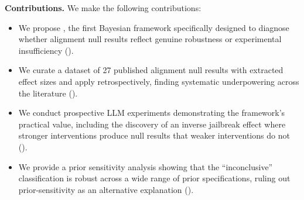{\bf Contributions.} We make the following contributions:
\begin{itemize}[leftmargin=*,itemsep=0pt,topsep=4pt]
    \item We propose \ours, the first Bayesian framework specifically designed to
    diagnose whether alignment null results reflect genuine robustness or
    experimental insufficiency ().
    \item We curate a dataset of 27 published alignment null results with extracted
    effect sizes and apply \ours retrospectively, finding systematic underpowering
    across the literature ().
    \item We conduct prospective LLM experiments demonstrating the framework's
    practical value, including the discovery of an inverse jailbreak effect where
    stronger interventions produce null results that weaker interventions do not
    ().
    \item We provide a prior sensitivity analysis showing that the ``inconclusive''
    classification is robust across a wide range of prior specifications, ruling out
    prior-sensitivity as an alternative explanation ().
\end{itemize}
